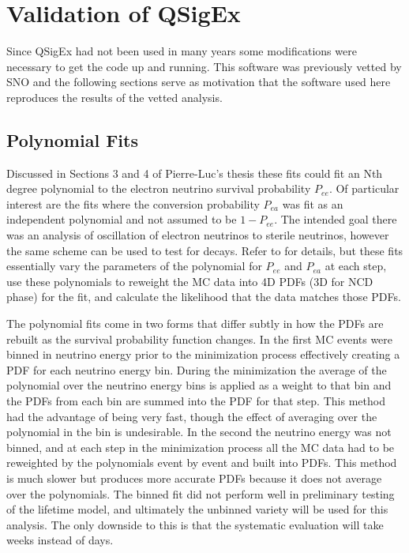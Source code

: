 \chapter{Validation of QSigEx}
\label{qsigex_validation}

Since QSigEx had not been used in many years some modifications were necessary to get the code up and running. 
This software was previously vetted by SNO and the following sections serve as motivation that the software used here reproduces the results of the vetted analysis.

\section{Polynomial Fits}

Discussed in Sections 3 and 4 of Pierre-Luc's thesis \cite{plthesis} these fits could fit an Nth degree polynomial to the electron neutrino survival probability $P_{ee}$. 
Of particular interest are the fits where the conversion probability $P_{ea}$ was fit as an independent polynomial and not assumed to be $1-P_{ee}$. 
The intended goal there was an analysis of oscillation of electron neutrinos to sterile neutrinos, however the same scheme can be used to test for decays.
Refer to \cite{plthesis} for details, but these fits essentially vary the parameters of the polynomial for $P_{ee}$ and $P_{ea}$ at each step, use these polynomials to reweight the MC data into 4D PDFs (3D for NCD phase) for the fit, and calculate the likelihood that the data matches those PDFs. 

The polynomial fits come in two forms that differ subtly in how the PDFs are rebuilt as the survival probability function changes.
In the first MC events were binned in neutrino energy prior to the minimization process effectively creating a PDF for each neutrino energy bin. 
During the minimization the average of the polynomial over the neutrino energy bins is applied as a weight to that bin and the PDFs from each bin are summed into the PDF for that step.
This method had the advantage of being very fast, though the effect of averaging over the polynomial in the bin is undesirable.
In the second the neutrino energy was not binned, and at each step in the minimization process all the MC data had to be reweighted by the polynomials event by event and built into PDFs. 
This method is much slower but produces more accurate PDFs because it does not average over the polynomials.
The binned fit did not perform well in preliminary testing of the lifetime model, and ultimately the unbinned variety will be used for this analysis.
The only downside to this is that the systematic evaluation will take weeks instead of days.


